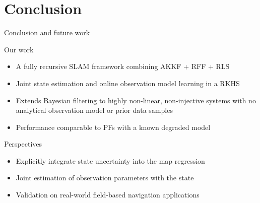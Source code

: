 \documentclass[9pt]{beamer}
\begin{document}
\section{Conclusion}

\begin{frame}{Conclusion and future work}

\begin{block}{Our work}
    \begin{itemize}
    \item A fully recursive SLAM framework combining AKKF + RFF + RLS
    \item Joint state estimation and online observation model learning in a RKHS
    \item Extends Bayesian filtering to highly non-linear, non-injective systems with no analytical observation model or prior data samples
    \item Performance comparable to PFs with a known degraded model
    \end{itemize}
\end{block}

\begin{block}{Perspectives}
    \begin{itemize}
    \item Explicitly integrate state uncertainty into the map regression
    \item Joint estimation of observation parameters with the state
    \item Validation on real-world field-based navigation applications
    \end{itemize}
\end{block}

\end{frame}
\end{document}
